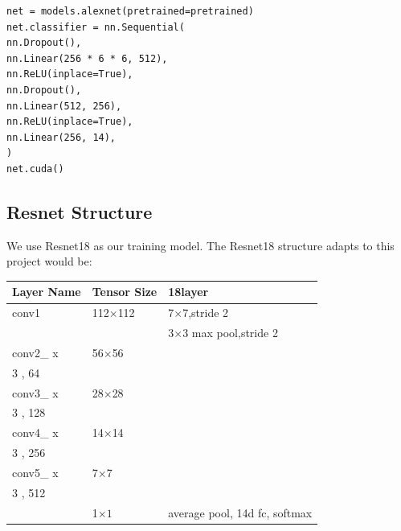 \documentclass{article}
\begin{document}
\begin{commandline}
	\begin{verbatim}
net = models.alexnet(pretrained=pretrained)
net.classifier = nn.Sequential(
nn.Dropout(),
nn.Linear(256 * 6 * 6, 512),
nn.ReLU(inplace=True),
nn.Dropout(),
nn.Linear(512, 256),
nn.ReLU(inplace=True),
nn.Linear(256, 14),
)
net.cuda()
	\end{verbatim}
\end{commandline}






\subsection{Resnet Structure}

We use Resnet18 as our training model. The Resnet18 structure adapts to this project would be:

\begin{center} 
	\begin{tabular}{ | l | l | l |} 
		\hline 
		Layer Name & Tensor Size      & 18\-layer  \\ \hline 
		conv1  & 112$\times$112 & 7$\times$7,stride 2  \\ \hline 
		&                         & 3$\times$3 max pool,stride 2  \\ \hline 
		conv2\_ x    &  56$\times$56  & \( \left [  \begin{array}{lcl}  3 \times 3, 64 \\   3 \times 3, 64    \end{array}   \right] \times 2 \)\\ \hline
		conv3\_ x    &  28$\times$28  & \( \left [  \begin{array}{lcl}  3 \times 3, 128\\   3 \times 3, 128   \end{array}   \right] \times 2 \)\\ \hline
		conv4\_ x    &  14$\times$14  & \( \left [  \begin{array}{lcl}  3 \times 3, 256\\   3 \times 3, 256   \end{array}   \right] \times 2 \)\\ \hline
		conv5\_ x    &  7$\times$7     & \( \left [  \begin{array}{lcl}  3 \times 3, 512\\   3 \times 3, 512 \end{array}   \right] \times 2 \)\\ \hline
		& 1$\times 1$     & average pool, 14\-d fc, softmax \\ \hline
	\end{tabular}  
\end{center} 
\end{document}

